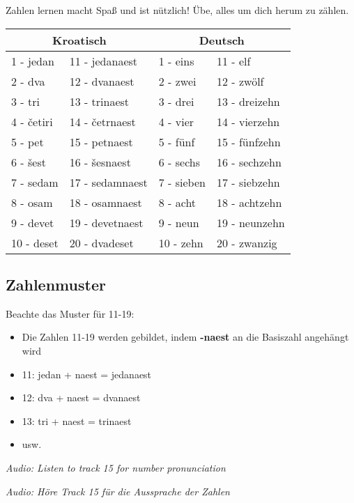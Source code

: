 \begin{vocabulary}
Zahlen lernen macht Spaß und ist nützlich! Übe, alles um dich herum zu zählen.

\begin{center}
\begin{tabular}{llll}
\toprule
\multicolumn{2}{c}{Kroatisch} & \multicolumn{2}{c}{Deutsch} \\
\midrule
1 - jedan & 11 - jedanaest & 1 - eins & 11 - elf \\
2 - dva & 12 - dvanaest & 2 - zwei & 12 - zwölf \\
3 - tri & 13 - trinaest & 3 - drei & 13 - dreizehn \\
4 - četiri & 14 - četrnaest & 4 - vier & 14 - vierzehn \\
5 - pet & 15 - petnaest & 5 - fünf & 15 - fünfzehn \\
6 - šest & 16 - šesnaest & 6 - sechs & 16 - sechzehn \\
7 - sedam & 17 - sedamnaest & 7 - sieben & 17 - siebzehn \\
8 - osam & 18 - osamnaest & 8 - acht & 18 - achtzehn \\
9 - devet & 19 - devetnaest & 9 - neun & 19 - neunzehn \\
10 - deset & 20 - dvadeset & 10 - zehn & 20 - zwanzig \\
\bottomrule
\end{tabular}
\end{center}

\subsection*{Zahlenmuster}

Beachte das Muster für 11-19:

\begin{itemize}
    \item Die Zahlen 11-19 werden gebildet, indem \textbf{-naest} an die Basiszahl angehängt wird
    \item 11: jedan + naest = jedanaest
    \item 12: dva + naest = dvanaest
    \item 13: tri + naest = trinaest
    \item usw.
\end{itemize}

\textit{Audio: Listen to track 15 for number pronunciation}

\textit{Audio: Höre Track 15 für die Aussprache der Zahlen}
\end{vocabulary}

